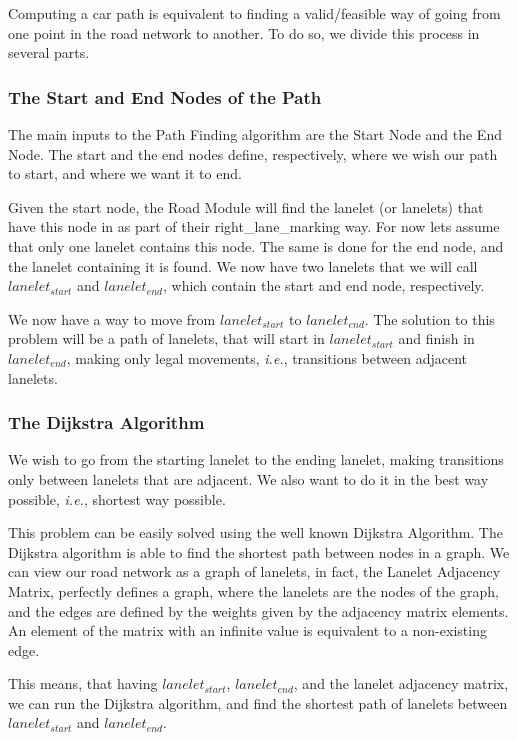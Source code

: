 Computing a car path is equivalent to finding a valid/feasible way of going from one point in the road network to another. To do so, we divide this process in several parts.

\subsubsection{The Start and End Nodes of the Path}

The main inputs to the Path Finding algorithm are the Start Node and the End Node. The start and the end nodes define, respectively, where we wish our path to start, and where we want it to end.

Given the start node, the Road Module will find the lanelet (or lanelets) that have this node in as part of their right\_lane\_marking way. For now lets assume that only one lanelet contains this node. The same is done for the end node, and the lanelet containing it is found. We now have two lanelets that we will call $lanelet_{start}$ and $lanelet_{end}$, which contain the start and end node, respectively.

We now have a way to move from $lanelet_{start}$ to $lanelet_{end}$. The solution to this problem will be a path of lanelets, that will start in $lanelet_{start}$ and finish in $lanelet_{end}$, making only legal movements, \textit{i.e.}, transitions between adjacent lanelets.

\subsubsection{The Dijkstra Algorithm}

We wish to go from the starting lanelet to the ending lanelet, making transitions only between lanelets that are adjacent. We also want to do it in the best way possible, \textit{i.e.}, shortest way possible. 

This problem can be easily solved using the well known Dijkstra Algorithm. The Dijkstra algorithm is able to find the shortest path between nodes in a graph. We can view our road network as a graph of lanelets, in fact, the Lanelet Adjacency Matrix, perfectly defines a graph, where the lanelets are the nodes of the graph, and the edges are defined by the weights given by the adjacency matrix elements. An element of the matrix with an infinite value is equivalent to a non-existing edge.

This means, that having $lanelet_{start}$, $lanelet_{end}$, and the lanelet adjacency matrix, we can run the Dijkstra algorithm, and find the shortest path of lanelets between $lanelet_{start}$ and $lanelet_{end}$.

